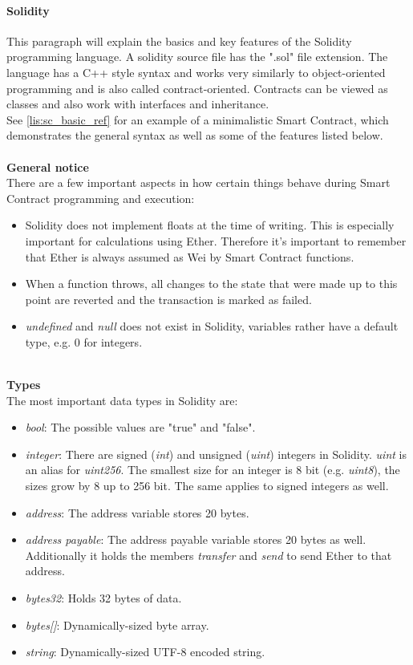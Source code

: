 \paragraph{Solidity}
This paragraph will explain the basics and key features of the Solidity programming language.
A solidity source file has the ".sol" file extension. The language has a C++ style syntax and works very similarly to object-oriented programming and is also called contract-oriented\cite{doc-oriented}. Contracts can be viewed as classes and also work with interfaces and inheritance.
\\
See \ref{lis:sc_basic_ref} for an example of a minimalistic Smart Contract, which demonstrates the general syntax as well as some of the features listed below.
\\\\
\textbf{General notice}\\
There are a few important aspects in how certain things behave during Smart Contract programming and execution:
\begin{itemize}
  \item Solidity does not implement floats at the time of writing. This is especially important for calculations using Ether. Therefore it's important to remember that Ether is always assumed as Wei by Smart Contract functions.
  \item When a function throws, all changes to the state that were made up to this point are reverted and the transaction is marked as failed.
  \item \textit{undefined} and \textit{null} does not exist in Solidity, variables rather have a default type, e.g. 0 for integers\cite{doc-types}.
\end{itemize}
\leavevmode
\\
\textbf{Types}\\
The most important data types in Solidity are\cite{doc-types}:
\begin{itemize}
  \item \textit{bool}: The possible values are "true" and "false".
  \item \textit{integer}: There are signed (\textit{int}) and unsigned (\textit{uint}) integers in Solidity. \textit{uint} is an alias for \textit{uint256}. The smallest size for an integer is 8 bit (e.g. \textit{uint8}), the sizes grow by 8 up to 256 bit. The same applies to signed integers as well.
  \item \textit{address}: The address variable stores 20 bytes.
  \item \textit{address payable}: The address payable variable stores 20 bytes as well. Additionally it holds the members \textit{transfer} and \textit{send} to send Ether to that address.
  \item \textit{bytes32}: Holds 32 bytes of data.
  \item \textit{bytes[]}: Dynamically-sized byte array.
  \item \textit{string}: Dynamically-sized UTF-8 encoded string.
\end{itemize}
